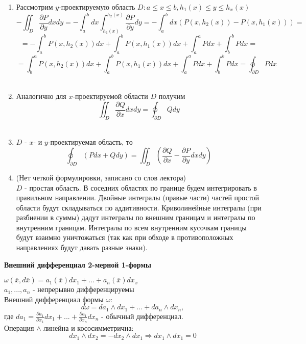    \begin{enumerate}
        \item 
        Рассмотрим $y$-проектируемую область $D: a \leq x \leq b, h_1(x) \leq y \leq h_x(x)$\\
        $$-\iint_D \frac{\partial P}{\partial y} dxdy = 
        -\int_a^b dx \int_{h_1(x)}^{h_2(x)}\frac{\partial P}{\partial y}dy =
        -\int_a^b dx (P(x, h_2(x)) - P(x, h_1(x))) = $$
        $$= -\int_a^bP(x, h_2(x))dx + \int_a^b P(x, h_1(x))dx + \int_a^a Pdx + \int_b^b Pdx = $$
        $$= \int_b^aP(x, h_2(x))dx + \int_a^b P(x, h_1(x))dx + \int_a^a Pdx + \int_b^b Pdx = 
        \oint_{\partial D} Pdx$$\\
        \item
        Аналогично для $x$-проектируемой области $D$ получим\\
        $$\iint_D\frac{\partial Q}{\partial x}dxdy = \oint_{\partial D} Q dy$$\\
        \item
        $D$ - $x$- и $y$-проектируемая область, то \\
        $$\oint_{\partial D}(Pdx + Qdy) = \iint_D (\frac{\partial Q}{\partial x} - \frac{\partial P}{\partial y}dxdy)$$
        \item (Нет четкой формулировки, записано со слов лектора)\\
        $D$ - простая область. В соседних областях по границе будем интегрировать в правильном направлении. Двойные интегралы (правые части) частей простой области будут складываться по аддитивности. Криволинейные интегралы (при разбиении в суммы) дадут интегралы по внешним границам и интегралы по внутренним границам. Интегралы по всем внутренним кусочкам границы будут взаимно уничтожаться (так как при обходе в противоположных направлениях будут давать разные знаки).
    \end{enumerate}
    
    \blacksquare
    
    \begin{center}
        \textbf{Внешний дифференциал 2-мерной 1-формы}
    \end{center}
    $\omega(\overline{x}, d\overline{x}) = a_1(\overline{x})dx_1 + ... + a_n(\overline{x})dx_x$\\
    $a_1, ..., a_n$ - непрерывно дифференцируемы\\
    Внешний дифференциал формы $\omega$:\\
    $$d\omega = da_1 \wedge dx_1 + ... + da_n \wedge dx_n,$$
    где $da_1 = \frac{\partial a_1}{\partial x_1} dx_1 + ... + \frac{\partial a_1}{\partial x_n}dx_n$ - обычный дифференциал.\\
    Операция $\wedge$ линейна и кососимметрична:\\
    $$dx_1 \wedge dx_2 = - dx_2 \wedge dx_1 \Rightarrow dx_1 \wedge dx_1 = 0$$\\
    
